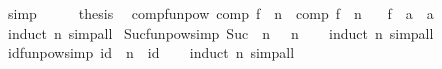 \begin{isabellebody}
\ simp\isanewline
\ \ \isamarkupfalse%
\ \isamarkupfalse%
\ {\isacharquery}{\kern0pt}thesis\ \isacommand{{\isachardot}{\kern0pt}}\isamarkupfalse%
\isanewline
{}\isamarkupfalse%
%
\endisatagproof
{\isafoldproof}%
%
\isadelimproof
\isanewline
%
\endisadelimproof
\isanewline
{}\isamarkupfalse%
\ comp{\isacharunderscore}{\kern0pt}funpow{\isacharcolon}{\kern0pt}\ {\isachardoublequoteopen}comp\ f\ {\isacharcircum}{\kern0pt}{\isacharcircum}{\kern0pt}\ n\ {\isacharequal}{\kern0pt}\ comp\ {\isacharparenleft}{\kern0pt}f\ {\isacharcircum}{\kern0pt}{\isacharcircum}{\kern0pt}\ n{\isacharparenright}{\kern0pt}{\isachardoublequoteclose}\isanewline
\ \ \ f\ {\isacharcolon}{\kern0pt}{\isacharcolon}{\kern0pt}\ {\isachardoublequoteopen}{\isacharprime}{\kern0pt}a\ {\isasymRightarrow}\ {\isacharprime}{\kern0pt}a{\isachardoublequoteclose}\isanewline
%
\isadelimproof
\ \ %
\endisadelimproof
%
\isatagproof
{}\isamarkupfalse%
\ {\isacharparenleft}{\kern0pt}induct\ n{\isacharparenright}{\kern0pt}\ simp{\isacharunderscore}{\kern0pt}all%
\endisatagproof
{\isafoldproof}%
%
\isadelimproof
\isanewline
%
\endisadelimproof
\isanewline
{}\isamarkupfalse%
\ Suc{\isacharunderscore}{\kern0pt}funpow{\isacharbrackleft}{\kern0pt}simp{\isacharbrackright}{\kern0pt}{\isacharcolon}{\kern0pt}\ {\isachardoublequoteopen}Suc\ {\isacharcircum}{\kern0pt}{\isacharcircum}{\kern0pt}\ n\ {\isacharequal}{\kern0pt}\ {\isacharparenleft}{\kern0pt}{\isacharparenleft}{\kern0pt}{\isacharplus}{\kern0pt}{\isacharparenright}{\kern0pt}\ n{\isacharparenright}{\kern0pt}{\isachardoublequoteclose}\isanewline
%
\isadelimproof
\ \ %
\endisadelimproof
%
\isatagproof
{}\isamarkupfalse%
\ {\isacharparenleft}{\kern0pt}induct\ n{\isacharparenright}{\kern0pt}\ simp{\isacharunderscore}{\kern0pt}all%
\endisatagproof
{\isafoldproof}%
%
\isadelimproof
\isanewline
%
\endisadelimproof
\isanewline
{}\isamarkupfalse%
\ id{\isacharunderscore}{\kern0pt}funpow{\isacharbrackleft}{\kern0pt}simp{\isacharbrackright}{\kern0pt}{\isacharcolon}{\kern0pt}\ {\isachardoublequoteopen}id\ {\isacharcircum}{\kern0pt}{\isacharcircum}{\kern0pt}\ n\ {\isacharequal}{\kern0pt}\ id{\isachardoublequoteclose}\isanewline
%
\isadelimproof
\ \ %
\endisadelimproof
%
\isatagproof
{}\isamarkupfalse%
\ {\isacharparenleft}{\kern0pt}induct\ n{\isacharparenright}{\kern0pt}\ simp{\isacharunderscore}{\kern0pt}all%
\endisatagproof
{\isafoldproof}%
%
\isadelimproof
\isanewline
%
\endisadelimproof
\isanewline
{}\isamarkupfalse%

\end{isabellebody}
